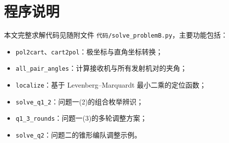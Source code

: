 \documentclass[UTF8,a4paper,11pt]{ctexart}
\begin{document}
\appendix
\section{程序说明}

本文完整求解代码见随附文件 \texttt{代码/solve\_problemB.py}，主要功能包括：
\begin{itemize}
  \item \texttt{pol2cart}、\texttt{cart2pol}：极坐标与直角坐标转换；
  \item \texttt{all\_pair\_angles}：计算接收机与所有发射机对的夹角；
  \item \texttt{localize}：基于 Levenberg--Marquardt 最小二乘的定位函数；
  \item \texttt{solve\_q1\_2}：问题一(2)的组合枚举辨识；
  \item \texttt{q1\_3\_rounds}：问题一(3)的多轮调整方案；
  \item \texttt{solve\_q2}：问题二的锥形编队调整示例。
\end{itemize}
\end{document}
